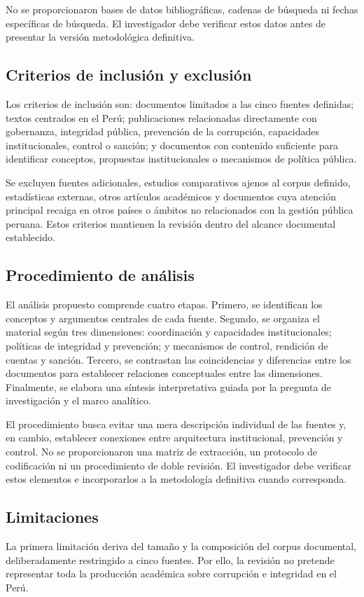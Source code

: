 \documentclass[Afour,sageh,times]{sagej}
\begin{document}
No se proporcionaron bases de datos bibliográficas, cadenas de búsqueda ni fechas específicas de búsqueda. El investigador debe verificar estos datos antes de presentar la versión metodológica definitiva.

\subsection{Criterios de inclusión y exclusión}
Los criterios de inclusión son: documentos limitados a las cinco fuentes definidas; textos centrados en el Perú; publicaciones relacionadas directamente con gobernanza, integridad pública, prevención de la corrupción, capacidades institucionales, control o sanción; y documentos con contenido suficiente para identificar conceptos, propuestas institucionales o mecanismos de política pública.

Se excluyen fuentes adicionales, estudios comparativos ajenos al corpus definido, estadísticas externas, otros artículos académicos y documentos cuya atención principal recaiga en otros países o ámbitos no relacionados con la gestión pública peruana. Estos criterios mantienen la revisión dentro del alcance documental establecido.

\subsection{Procedimiento de análisis}
El análisis propuesto comprende cuatro etapas. Primero, se identifican los conceptos y argumentos centrales de cada fuente. Segundo, se organiza el material según tres dimensiones: coordinación y capacidades institucionales; políticas de integridad y prevención; y mecanismos de control, rendición de cuentas y sanción. Tercero, se contrastan las coincidencias y diferencias entre los documentos para establecer relaciones conceptuales entre las dimensiones. Finalmente, se elabora una síntesis interpretativa guiada por la pregunta de investigación y el marco analítico.

El procedimiento busca evitar una mera descripción individual de las fuentes y, en cambio, establecer conexiones entre arquitectura institucional, prevención y control. No se proporcionaron una matriz de extracción, un protocolo de codificación ni un procedimiento de doble revisión. El investigador debe verificar estos elementos e incorporarlos a la metodología definitiva cuando corresponda.

\subsection{Limitaciones}
La primera limitación deriva del tamaño y la composición del corpus documental, deliberadamente restringido a cinco fuentes. Por ello, la revisión no pretende representar toda la producción académica sobre corrupción e integridad en el Perú.
\end{document}
